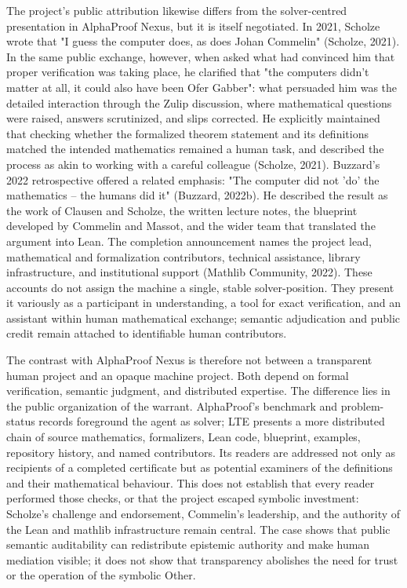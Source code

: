 \documentclass[pdflatex,sn-apa]{sn-jnl}
\begin{document}
The project's public attribution likewise differs from the solver-centred presentation in AlphaProof Nexus, but it is itself negotiated. In 2021, Scholze wrote that "I guess the computer does, as does Johan Commelin" (Scholze, 2021). In the same public exchange, however, when asked what had convinced him that proper verification was taking place, he clarified that "the computers didn't matter at all, it could also have been Ofer Gabber": what persuaded him was the detailed interaction through the Zulip discussion, where mathematical questions were raised, answers scrutinized, and slips corrected. He explicitly maintained that checking whether the formalized theorem statement and its definitions matched the intended mathematics remained a human task, and described the process as akin to working with a careful colleague (Scholze, 2021). Buzzard's 2022 retrospective offered a related emphasis: "The computer did not 'do' the mathematics -- the humans did it" (Buzzard, 2022b). He described the result as the work of Clausen and Scholze, the written lecture notes, the blueprint developed by Commelin and Massot, and the wider team that translated the argument into Lean. The completion announcement names the project lead, mathematical and formalization contributors, technical assistance, library infrastructure, and institutional support (Mathlib Community, 2022). These accounts do not assign the machine a single, stable solver-position. They present it variously as a participant in understanding, a tool for exact verification, and an assistant within human mathematical exchange; semantic adjudication and public credit remain attached to identifiable human contributors.

The contrast with AlphaProof Nexus is therefore not between a transparent human project and an opaque machine project. Both depend on formal verification, semantic judgment, and distributed expertise. The difference lies in the public organization of the warrant. AlphaProof's benchmark and problem-status records foreground the agent as solver; LTE presents a more distributed chain of source mathematics, formalizers, Lean code, blueprint, examples, repository history, and named contributors. Its readers are addressed not only as recipients of a completed certificate but as potential examiners of the definitions and their mathematical behaviour. This does not establish that every reader performed those checks, or that the project escaped symbolic investment: Scholze's challenge and endorsement, Commelin's leadership, and the authority of the Lean and mathlib infrastructure remain central. The case shows that public semantic auditability can redistribute epistemic authority and make human mediation visible; it does not show that transparency abolishes the need for trust or the operation of the symbolic Other.
\end{document}
